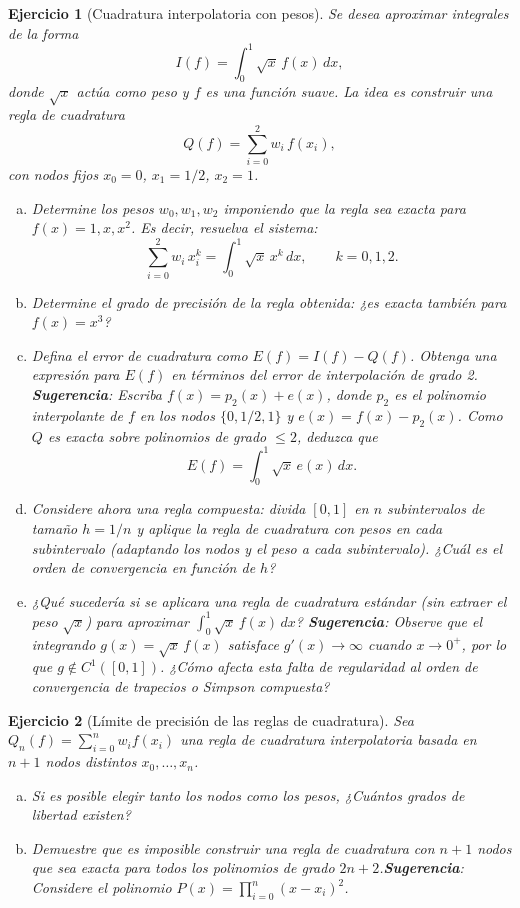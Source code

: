 \documentclass[12pt]{article}
\newtheorem{exercise}{Ejercicio}
\begin{document}
\begin{exercise}[Cuadratura interpolatoria con pesos]
Se desea aproximar integrales de la forma
\[
I(f) = \int_0^1 \sqrt{x}\, f(x)\, dx,
\]
donde $\sqrt{x}$ actúa como \emph{peso} y $f$ es una función suave. La idea es construir una regla de cuadratura
\[
Q(f) = \sum_{i=0}^{2} w_i\, f(x_i),
\]
con nodos fijos $x_0 = 0$, $x_1 = 1/2$, $x_2 = 1$.
\begin{enumerate}[(a)]
\item Determine los pesos $w_0, w_1, w_2$ imponiendo que la regla sea exacta para $f(x) = 1, x, x^2$. Es decir, resuelva el sistema:
\[
\sum_{i=0}^{2} w_i\, x_i^k = \int_0^1 \sqrt{x}\, x^k\, dx, \qquad k = 0, 1, 2.
\]
\item Determine el grado de precisión de la regla obtenida: ¿es exacta también para $f(x) = x^3$?
\item Defina el error de cuadratura como $E(f)=I(f)-Q(f)$. Obtenga una expresión para $E(f)$ en términos del error de interpolación de grado 2. \textbf{Sugerencia}: Escriba $f(x)=p_2(x)+e(x)$, donde $p_2$ es el polinomio interpolante de $f$ en los nodos $\{0,1/2,1\}$ y $e(x)=f(x)-p_2(x)$. Como $Q$ es exacta sobre polinomios de grado $\le 2$, deduzca que
\[
E(f)=\int_0^1 \sqrt{x}\,e(x)\,dx.
\]
\item Considere ahora una regla compuesta: divida $[0, 1]$ en $n$ subintervalos de tamaño $h = 1/n$ y aplique la regla de cuadratura con pesos en cada subintervalo (adaptando los nodos y el peso a cada subintervalo). ¿Cuál es el orden de convergencia en función de $h$?
\item ¿Qué sucedería si se aplicara una regla de cuadratura estándar (sin extraer el peso $\sqrt{x}$) para aproximar $\int_0^1 \sqrt{x}\, f(x)\, dx$? \textbf{Sugerencia}: Observe que el integrando $g(x) = \sqrt{x}\, f(x)$ satisface $g'(x) \to \infty$ cuando $x \to 0^+$, por lo que $g \notin C^1([0,1])$. ¿Cómo afecta esta falta de regularidad al orden de convergencia de trapecios o Simpson compuesta?
\end{enumerate}
\end{exercise}

\begin{exercise}[Límite de precisión de las reglas de cuadratura]
Sea $Q_n(f) = \sum_{i=0}^n w_i f(x_i)$ una regla de cuadratura interpolatoria basada en $n+1$ nodos distintos $x_0, \ldots, x_n$.
\begin{enumerate}[(a)]
\item Si es posible elegir tanto los nodos como los pesos, ¿Cuántos grados de libertad existen? 
\item Demuestre que es imposible construir una regla de cuadratura con $n+1$ nodos que sea exacta para todos los polinomios de grado $2n+2$.\textbf{Sugerencia}: Considere el polinomio $P(x) = \prod_{i=0}^n (x-x_i)^2$.
\end{enumerate}
\end{exercise}
\end{document}
